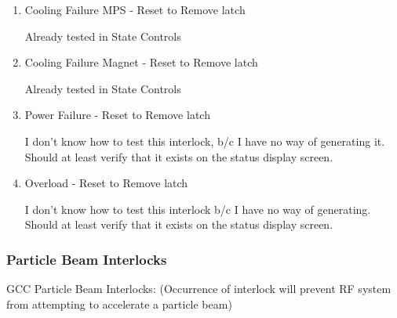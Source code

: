 \documentclass[11pt]{book}		%
\begin{document}
\begin{enumerate}
 \item Cooling Failure MPS - Reset to Remove latch

\color{red}
Already tested in State Controls
\color{black}

 \item Cooling Failure Magnet - Reset to Remove latch

\color{red}
Already tested in State Controls
\color{black}

 \item Power Failure - Reset to Remove latch

\color{red}
I don't know how to test this interlock, b/c I have no way of generating it. Should at least verify that it exists on the status display screen.
\color{black}

\item Overload - Reset to Remove latch

\color{red}
I don't know how to test this interlock b/c I have no way of generating. Should at least verify that it exists on the status display screen.
\color{black}

\end{enumerate}

\subsubsection{Particle Beam Interlocks}

GCC Particle Beam Interlocks:
(Occurrence of interlock will prevent RF system from attempting to accelerate a particle beam)
\end{document}
